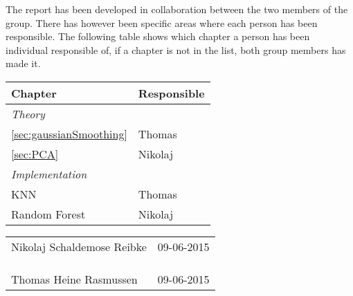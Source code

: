 \documentclass[report]{subfiles}
\begin{document}
The report has been developed in collaboration between the two members of the group. There has however been specific areas where each person has been responsible. The following table shows which chapter a person has been individual responsible of, if a chapter is not in the list, both group members has made it.\\
	
\begin{tabularx}{\textwidth} {| l | X |}
	\hline
	\textbf{Chapter} & 
	\textbf{Responsible}\\
	\hline
	\textit{Theory}	& \\
	\ref{sec:gaussianSmoothing} \nameref{sec:gaussianSmoothing} & 
		Thomas\\
	\ref{sec:PCA} \nameref{sec:PCA} & 
		Nikolaj\\
	\hline
	\textit{Implementation} & \\
		KNN	& Thomas \\
		Random Forest & Nikolaj \\
	\hline
\end{tabularx}

\vfill
\begin{tabularx}{\textwidth}{X r}
\hline
Nikolaj Schaldemose Reibke  & 09-06-2015\\
\\
\\
\\
\hline
Thomas Heine Rasmussen		& 09-06-2015
\end{tabularx}
\end{document}
